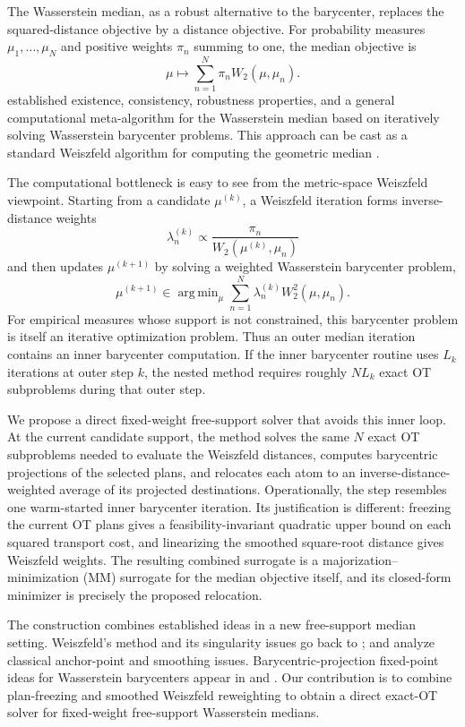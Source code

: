 \documentclass[pdflatex,sn-mathphys-ay]{sn-jnl}%
\theoremstyle{thmstyleone}%
\theoremstyle{thmstyletwo}%
\theoremstyle{thmstylethree}%
\DeclareMathOperator*{\argmin}{arg\,min}
\begin{document}
The Wasserstein median, as a robust alternative to the barycenter, replaces the squared-distance objective by a distance objective. For probability measures \(\mu_1,\ldots,\mu_N\) and positive weights \(\pi_n\) summing to one, the median objective is
\begin{equation}\label{eq:intro-median}
    \mu \mapsto \sum_{n=1}^N \pi_n W_2(\mu,\mu_n).
\end{equation}
\citet{you_2025_WassersteinMedianProbability} established existence, consistency, robustness properties, and a general computational meta-algorithm for the Wasserstein median based on iteratively solving Wasserstein barycenter problems. This approach can be cast as a standard Weiszfeld algorithm for computing the geometric median \citep{weiszfeld_1937_PointPourLequel}.


The computational bottleneck is easy to see from the metric-space Weiszfeld viewpoint. Starting from a candidate \(\mu^{(k)}\), a Weiszfeld iteration forms inverse-distance weights
\[
    \lambda_n^{(k)} \propto \frac{\pi_n}{W_2(\mu^{(k)},\mu_n)}
\]
and then updates \(\mu^{(k+1)}\) by solving a weighted Wasserstein barycenter problem,
\[
    \mu^{(k+1)} \in \argmin_{\mu}\sum_{n=1}^N \lambda_n^{(k)} W_2^2(\mu,\mu_n).
\]
For empirical measures whose support is not constrained, this barycenter problem is itself an iterative optimization problem. Thus an outer median iteration contains an inner barycenter computation. If the inner barycenter routine uses \(L_k\) iterations at outer step \(k\), the nested method requires roughly \(N L_k\) exact OT subproblems during that outer step.

We propose a direct fixed-weight free-support solver that avoids this inner loop. At the current candidate support, the method solves the same \(N\) exact OT subproblems needed to evaluate the Weiszfeld distances, computes barycentric projections of the selected plans, and relocates each atom to an inverse-distance-weighted average of its projected destinations. Operationally, the step resembles one warm-started inner barycenter iteration. Its justification is different: freezing the current OT plans gives a feasibility-invariant quadratic upper bound on each squared transport cost, and linearizing the smoothed square-root distance gives Weiszfeld weights. The resulting combined surrogate is a majorization--minimization (MM) surrogate for the median objective itself, and its closed-form minimizer is precisely the proposed relocation.

The construction combines established ideas in a new free-support median setting. Weiszfeld's method and its singularity issues go back to \citet{weiszfeld_1937_PointPourLequel}; \citet{kuhn_1973_NoteFermatsProblem} and \citet{beck_2015_WeiszfeldsMethodOld} analyze classical anchor-point and smoothing issues. Barycentric-projection fixed-point ideas for Wasserstein barycenters appear in \citet{alvarez-esteban_2016_FixedpointApproachBarycenters} and \citet{cuturi_2014_FastComputationWasserstein}. Our contribution is to combine plan-freezing and smoothed Weiszfeld reweighting to obtain a direct exact-OT solver for fixed-weight free-support Wasserstein medians.
\end{document}
